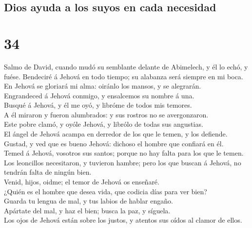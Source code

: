 \hypertarget{dios-ayuda-a-los-suyos-en-cada-necesidad}{%
\subsection{Dios ayuda a los suyos en cada
necesidad}\label{dios-ayuda-a-los-suyos-en-cada-necesidad}}

\hypertarget{section-19-34}{%
\section{34}\label{section-19-34}}

 Salmo de David, cuando mudó su semblante delante de
Abimelech, y él lo echó, y fuése. Bendeciré á Jehová en todo tiempo; su
alabanza será siempre en mi boca.\\
 En Jehová se gloriará mi alma: oiránlo los mansos, y se
alegrarán.\\
 Engrandeced á Jehová conmigo, y ensalcemos su nombre á
una.\\
 Busqué á Jehová, y él me oyó, y libróme de todos mis
temores.\\
 A él miraron y fueron alumbrados: y sus rostros no se
avergonzaron.\\
 Este pobre clamó, y oyóle Jehová, y librólo de todas sus
angustias.\\
 El ángel de Jehová acampa en derredor de los que le
temen, y los defiende.\\
 Gustad, y ved que es bueno Jehová: dichoso el hombre que
confiará en él.\\
 Temed á Jehová, vosotros sus santos; porque no hay falta
para los que le temen.\\
 Los leoncillos necesitaron, y tuvieron hambre; pero los
que buscan á Jehová, no tendrán falta de ningún bien.\\
 Venid, hijos, oidme; el temor de Jehová os enseñaré.\\
 ¿Quién es el hombre que desea vida, que codicia días
para ver bien?\\
 Guarda tu lengua de mal, y tus labios de hablar
engaño.\\
 Apártate del mal, y haz el bien; busca la paz, y
síguela.\\
 Los ojos de Jehová están sobre los justos, y atentos sus
oídos al clamor de ellos.\\
